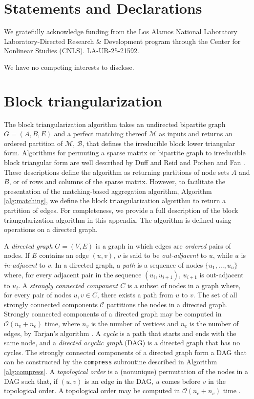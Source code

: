 \documentclass[smallextended]{svjour3}
\newcommand{\rev}[1]{{#1}}
\begin{document}


\section*{Statements and Declarations}
\rev{We gratefully acknowledge funding from the Los Alamos National Laboratory
Laboratory-Directed Research \& Development program through the Center for Nonlinear Studies
(CNLS).
LA-UR-25-21592.

\noindent We have no competing interests to disclose.}

\appendix
\section{Block triangularization}
\label{sec:block-triang}

The block triangularization algorithm takes an undirected bipartite graph $G=(A,B,E)$
and a perfect matching thereof $\mathcal{M}$ as inputs and returns an ordered partition
of $\mathcal{M}$, $\mathcal{B}$, that defines the irreducible block lower triangular
form.
Algorithms for permuting a sparse matrix or bipartite graph to irreducible block
triangular form are well described by Duff and Reid
\cite{duff1978implementation,duff1978algorithm} and Pothen and Fan \cite{pothen1990}.
These descriptions define the algorithm as returning partitions of node sets $A$ and
$B$, or of rows and columns of the sparse matrix.
However, to facilitate the presentation of the matching-based aggregation algorithm,
Algorithm \ref{alg:matching}, we define
the block triangularization algorithm to return a partition of edges. For completeness,
we provide a full description of the block triangularization algorithm in this appendix.
The algorithm is defined using operations on a directed graph.

A {\it directed graph} $G=(V, E)$ is a graph in which edges are {\it ordered} pairs
of nodes. If $E$ contains an edge $(u, v)$, $v$ is said to be {\it out-adjacent} to $u$,
while $u$ is {\it in-adjacent} to $v$.
In a directed graph, a {\it path} is a sequence of nodes $\{u_1, \dots, u_n\}$ where,
for every adjacent pair in the sequence $(u_i, u_{i+1})$, $u_{i+1}$ is out-adjacent
to $u_i$. A {\it strongly connected component} $C$ is a subset of nodes in a graph
where, for every pair of nodes $u,v\in C$, there exists a path from $u$ to $v$.
The set of all strongly connected components $\mathcal{C}$ partitions the nodes in a
directed graph.
Strongly connected components of a directed graph may be computed in
$\mathcal{O}(n_v+n_e)$ time, where $n_v$ is the number of vertices and $n_e$ is the
number of edges, by Tarjan's algorithm \cite{tarjan1972}.
A {\it cycle} is a path that starts and ends with the same node, and a {\it directed acyclic
graph} (DAG) is a directed graph that has no cycles.
The strongly connected components of a directed graph form a DAG that can be constructed
by the {\tt compress} subroutine described in Algorithm \ref{alg:compress}.
A {\it topological order} is a (nonunique) permutation of the nodes in a DAG such that,
if $(u, v)$ is an edge in the DAG, $u$ comes before $v$ in the topological order.
A topological order may be computed in $\mathcal{O}(n_e+n_v)$ time \cite{manber1989}.
\end{document}

